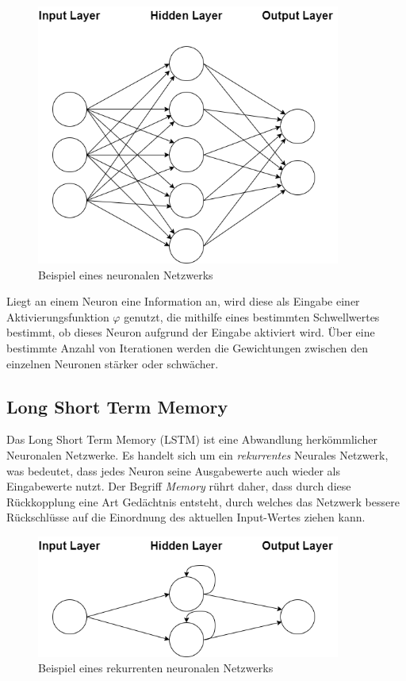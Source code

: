 \begin{figure}[h]
    \centering
    \includegraphics[width=10.0cm]{pic/NN.png}
    \caption{Beispiel eines neuronalen Netzwerks}
    \label{fig:NN}
\end{figure}

Liegt an einem Neuron eine Information an, wird diese als Eingabe einer Aktivierungsfunktion $\varphi$ genutzt, 
die mithilfe eines bestimmten Schwellwertes bestimmt, ob dieses Neuron aufgrund der Eingabe aktiviert wird. Über eine 
bestimmte Anzahl von Iterationen werden die Gewichtungen zwischen den einzelnen Neuronen stärker oder schwächer.


\subsection{Long Short Term Memory}
Das Long Short Term Memory (LSTM) ist eine Abwandlung herkömmlicher Neuronalen Netzwerke. Es handelt sich um ein
\textit{rekurrentes} Neurales Netzwerk, was bedeutet, dass jedes Neuron seine Ausgabewerte auch wieder als Eingabewerte
nutzt. Der Begriff \textit{Memory} rührt daher, dass durch diese Rückkopplung eine Art Gedächtnis entsteht, durch 
welches das Netzwerk bessere Rückschlüsse auf die Einordnung des aktuellen Input-Wertes ziehen kann.\\

\begin{figure}[h]
    \centering
    \includegraphics[width=10.0cm]{pic/RecurrentNN.png}
    \caption{Beispiel eines rekurrenten neuronalen Netzwerks}
    \label{fig:RecNN}
\end{figure}

